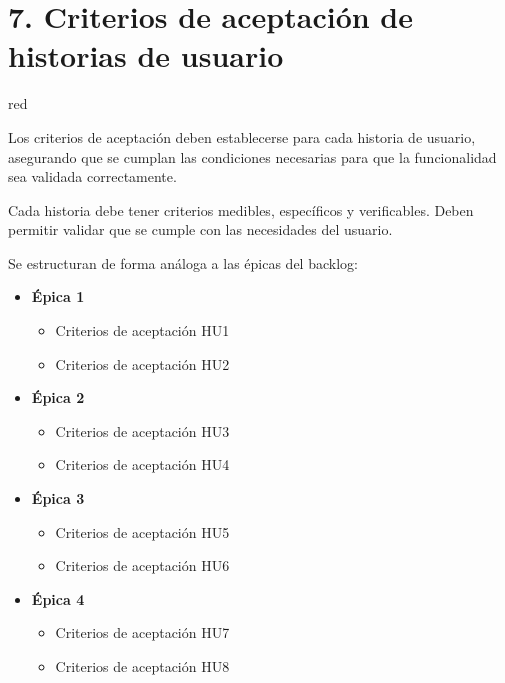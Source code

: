 \documentclass[
11pt, %
]{charter}
\begin{document}
\section{7. Criterios de aceptación de historias de usuario}
\label{sec:criteriosAceptacion}

\begin{consigna}{red} %

Los criterios de aceptación deben establecerse para cada historia de usuario, asegurando que se cumplan las condiciones necesarias para que la funcionalidad sea validada correctamente.

Cada historia debe tener criterios medibles, específicos y verificables. Deben permitir validar que se cumple con las necesidades del usuario.

Se estructuran de forma análoga a las \'{e}picas del backlog:

\begin{itemize}
  \item \textbf{\'{E}pica 1}
    \begin{itemize}
      \item Criterios de aceptación HU1
      \item Criterios de aceptación HU2
    \end{itemize}
  \item \textbf{\'{E}pica 2}
    \begin{itemize}
      \item Criterios de aceptación HU3
      \item Criterios de aceptación HU4
    \end{itemize}
  \item \textbf{\'{E}pica 3}
    \begin{itemize}
      \item Criterios de aceptación HU5
      \item Criterios de aceptación HU6
    \end{itemize}
  \item \textbf{\'{E}pica 4}
    \begin{itemize}
      \item Criterios de aceptación HU7
      \item Criterios de aceptación HU8
    \end{itemize}
\end{itemize}


\end{consigna}
\end{document}
